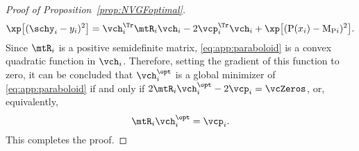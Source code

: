 \begin{proof}[Proof of Proposition~\ref{prop:NVGFoptimal}]
\begin{equation} \label{eq:app:paraboloid}
    \xp \big[ (\schy_{i}-y_{i})^{2} \big] = \vch_{i}^{\Tr} \mtR_{i} \vch_{i} - 2 \vcp_{i}^{\Tr} \vch_{i} + \xp \big[ (\rho(x_{i})-\mu_{\rho i})^{2} \big].
\end{equation}
%
Since $\mtR_{i}$ is a positive semidefinite matrix, \eqref{eq:app:paraboloid} is a convex quadratic function in $\vch_i$. Therefore, setting the gradient of this function to zero, it can be concluded that $\vch_i^{\opt}$ is a global minimizer of \eqref{eq:app:paraboloid} if and only if $2\mtR_i \vch_i^{\opt} - 2\vcp_i = \vcZeros$, or, equivalently,
%
\begin{equation}
    \mtR_{i} \vch_{i}^{\opt} = \vcp_{i}.
\end{equation}
%
This completes the proof.
\end{proof}

